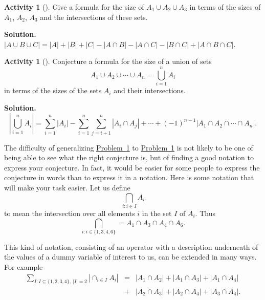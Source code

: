 \documentclass[10pt,]{book}
\theoremstyle{plain}
\theoremstyle{definition}
\newtheorem{activity}[project]{Activity}
\numberwithin{equation}{chapter}
\newcommand{\amp}{&}
\begin{document}
\begin{activity}[]\label{threesetintersection}
Give a formula for the size of \(A_1\cup A_2\cup A_3\) in terms of the sizes of \(A_1\), \(A_2\), \(A_3\) and the intersections of these sets.%
\par\medskip\noindent%
\textbf{Solution.}\quad \(|A\cup B\cup C|=|A|+|B|+|C|-|A\cap B|- |A\cap C| - |B\cap
C| +|A\cap B\cap C|\).%
\end{activity}
\begin{activity}[]\label{nsetintersection}
Conjecture a formula for the size of a union of sets%
\begin{equation*}
A_1\cup
A_2\cup \cdots\cup A_n = \bigcup_{i=1}^n A_i
\end{equation*}
in terms of the sizes of the sets \(A_i\) and their intersections.%
\par\medskip\noindent%
\textbf{Solution.}\quad %
\begin{equation*}
\left|\bigcup_{i=1}^n A_i\right| = \sum_{i=1}^n|A_i| -
\sum_{i=1}^n\sum_{j=i+1}^n |A_i \cap A_j| + \cdots +(-1)^{n-1} |A_1\cap
A_2\cap\cdots \cap A_n|.
\end{equation*}
\end{activity}
The difficulty of generalizing \hyperref[threesetintersection]{Problem~\ref{threesetintersection}} to \hyperref[nsetintersection]{Problem~\ref{nsetintersection}} is not likely to be one of being able to see what the right conjecture is, but of finding a good notation to express your conjecture. In fact, it would be easier for some people to express the conjecture in words than to express it in a notation. Here is some notation that will make your task easier. Let us define%
\begin{equation*}
\bigcap_{i:i\in I}A_i
\end{equation*}
to mean the intersection over all elements \(i\) in the set \(I\) of \(A_i\). Thus%
\begin{equation}
\bigcap_{i:i\in
\{1,3,4,6\}} = A_1\cap A_3\cap A_4 \cap A_6.\label{intersectionnotation}
\end{equation}
%
\par
This kind of notation, consisting of an operator with a description underneath of the values of a dummy variable of interest to us, can be extended in many ways. For example%
\begin{align*}
\sum_{I:I \subseteq \{1,2,3,4\}, \ |I|=2} |\cap_{i\in I}
A_i| \amp =\amp  |A_1\cap A_2|+ |A_1\cap A_3|
+|A_1\cap A_4|\nonumber\\
\amp +\amp  |A_2\cap A_3|+
|A_2\cap A_4| +|A_3\cap A_4|.
\end{align*}
\end{document}
